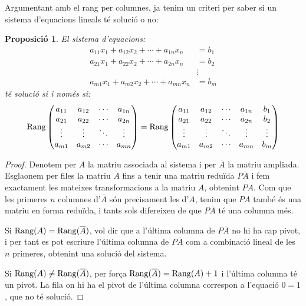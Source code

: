 \documentclass[
  11pt,
]{book}
\numberwithin{dummy}{section}
\theoremstyle{maincolornumbox}
\theoremstyle{blacknumex}
\theoremstyle{blacknumbox}
\theoremstyle{maincolornum}
\newtheorem{propositionT}{Proposició}[chapter]
\newenvironment{proposition}{\begin{pBox}\begin{propositionT}}{\end{propositionT}\end{pBox}}
\newlength\esp
\begin{document}
Argumentant amb el rang per columnes, ja tenim un criteri per saber si
un sistema d'equacions lineals té solució o no:

\begin{proposition}
El sistema d'equacions: \begin{align*}
    a_{11}x_1+a_{12}x_2+ \cdots + a_{1n}x_n &= b_1 \\
    a_{21}x_1+a_{22}x_2+ \cdots + a_{2n}x_n &= b_2 \\
    &\vdots \\
    a_{m1}x_1+a_{m2}x_2+ \cdots + a_{mn}x_n &= b_m
\end{align*} té solució si i només si: \[\operatorname{Rang} \begin{pmatrix}
    a_{11} & a_{12} & \cdots & a_{1n} \\
    a_{21} & a_{22} & \cdots & a_{2n} \\
    \vdots & \vdots & \ddots & \vdots \\
    a_{m1} & a_{m2} & \cdots & a_{mn} 
    \end{pmatrix} =
    \operatorname{Rang} \begin{pmatrix}
    a_{11} & a_{12} & \cdots & a_{1n} & b_1 \\
    a_{21} & a_{22} & \cdots & a_{2n} & b_2 \\
    \vdots & \vdots & \ddots & \vdots & \vdots \\
    a_{m1} & a_{m2} & \cdots & a_{mn} & b_m 
    \end{pmatrix}\]
\end{proposition}

\begin{proof}
Denotem per \(A\) la matriu associada al sistema i per
\(\overline{A}\) la matriu ampliada. Esglaonem per files la matriu
\(\overline{A}\) fins a tenir una matriu reduïda \(P\overline{A}\) i fem
exactament les mateixes transformacions a la matriu \(A\), obtenint \(PA\).
Com que les primeres \(n\) columnes d'\(\overline{A}\) són precisament les
d'\(A\), tenim que \(PA\) també és una matriu en forma reduïda, i tants sols
difereixen de que \(P\overline{A}\) té una columna més.

Si \(\operatorname{Rang}(A)=\operatorname{Rang}(\overline{A})\), vol dir que a l'última columna de
\(P\overline{A}\) no hi ha cap pivot, i per tant es pot escriure l'última
columna de \(P\overline{A}\) com a combinació lineal de les \(n\) primeres,
obtenint una solució del sistema.

Si \(\operatorname{Rang}(A)\neq\operatorname{Rang}(\overline{A})\), per força
\(\operatorname{Rang}(\overline{A})=\operatorname{Rang}(A)+1\) i l'última columna té un pivot. La fila
on hi ha el pivot de l'última columna correspon a l'equació \(0=1\), que
no té solució.
\end{proof}
\end{document}
